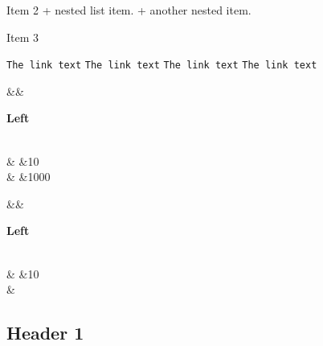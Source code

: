 \begin{DoxyPre}
\begin{DoxyItemize}
\item Item 2
  + nested list item.
  + another nested item.
\item Item 3
\end{DoxyItemize}\end{DoxyPre}



\begin{DoxyPre}{\tt The link text}
{\tt The link text}
{\tt The link text} 
{\tt The link text}\end{DoxyPre}



\begin{DoxyPre}\begin{TabularC}{3}
\hline
{}\PBS{}&\PBS{}&{\bf Left  

}\\
\PBS{}    &\PBS{}     &10    
\\
\PBS{}  &\PBS{}   &1000  
\\
\end{TabularC}
\end{DoxyPre}



\begin{DoxyPre}\begin{TabularC}{3}
\hline
{}\PBS{}&\PBS{}&{\bf Left  

}\\
\PBS{}    &\PBS{}     &10    
\\
\PBS{}  &\PBS\centering \\
\end{TabularC}
\end{DoxyPre}
\subsection{Header 1                }\label{classhidden_labelid}

\begin{DoxyPre}\end{DoxyPre}



\begin{DoxyPre}\end{DoxyPre}
